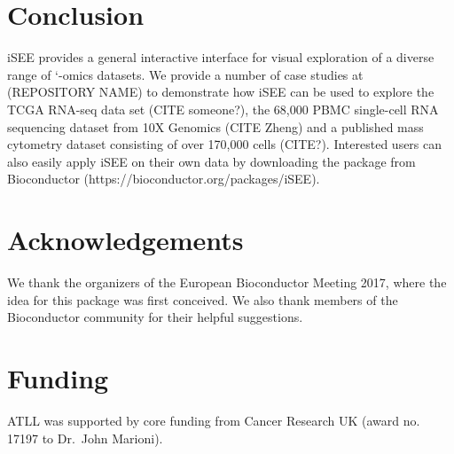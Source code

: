 \documentclass{bioinfo}
\begin{document}
\section{Conclusion}
iSEE provides a general interactive interface for visual exploration of a diverse range of `-omics datasets. 
We provide a number of case studies at (REPOSITORY NAME) to demonstrate how iSEE can be used to explore the TCGA RNA-seq data set (CITE someone?), the 68,000 PBMC single-cell RNA sequencing dataset from 10X Genomics (CITE Zheng) and a published mass cytometry dataset consisting of over 170,000 cells (CITE?). 
Interested users can also easily apply iSEE on their own data by downloading the package from Bioconductor (https://bioconductor.org/packages/iSEE).

\section*{Acknowledgements}
We thank the organizers of the European Bioconductor Meeting 2017, where the idea for this package was first conceived.
We also thank members of the Bioconductor community for their helpful suggestions. 
\vspace*{-12pt}

\section*{Funding}
ATLL was supported by core funding from Cancer Research UK (award no. 17197 to Dr.\ John Marioni).
\vspace*{-12pt}

%
%

%
%
%
%
%

\end{document}
